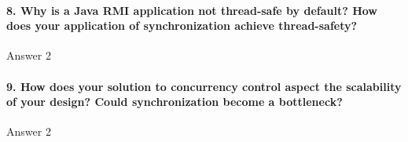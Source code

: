 \documentclass{ds-report}
\begin{document}
	\paragraph{8. Why is a Java RMI application not thread-safe by default? How does your application of synchronization achieve thread-safety?} 
	Answer 2

	\paragraph{9. How does your solution to concurrency control aspect the scalability of your design? Could
synchronization become a bottleneck?} 
	Answer 2

	
	\clearpage
	
	
\end{document}
